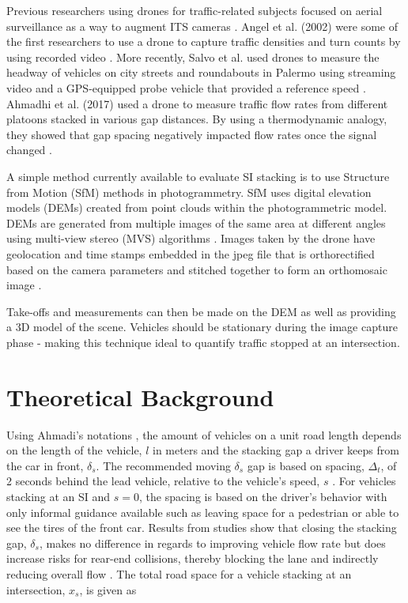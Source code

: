 \documentclass[preprint,12pt,a4paper]{elsarticle}
\begin{document}
\begin{linenumbers}
Previous researchers using drones for traffic-related subjects focused on aerial surveillance as a way to augment ITS cameras \citep{Liu2013, Barmpounakis2016}. Angel et al. (2002) were some of the first researchers to use a drone to capture traffic densities and turn counts by using recorded video \citep{Angel2002}. More recently, Salvo et al. used drones to measure the headway of vehicles on city streets and roundabouts in Palermo using streaming video and a GPS-equipped probe vehicle that provided a reference speed \citep{Salvo2014, Salvo2017}. Ahmadhi et al. (2017) used a drone to measure traffic flow rates from different platoons stacked in various gap distances. By using a thermodynamic analogy, they showed that gap spacing negatively impacted flow rates once the signal changed \citep{Ahmadi2017}.

A simple method currently available to evaluate SI stacking is to use Structure from Motion (SfM) methods in photogrammetry. SfM uses digital elevation models (DEMs) created from point clouds within the photogrammetric model. DEMs are generated from multiple images of the same area at different angles using multi-view stereo (MVS) algorithms \citep{James2017}. Images taken by the drone have geolocation and time stamps embedded in the jpeg file that is orthorectified based on the camera parameters and stitched together to form an orthomosaic image \citep{Westoby2012}.

Take-offs and measurements can then be made on the DEM as well as providing a 3D model of the scene. Vehicles should be stationary during the image capture phase - making this technique ideal to quantify traffic stopped at an intersection.

\section{Theoretical Background}

Using Ahmadi's notations \citep{Ahmadi2017}, the amount of vehicles on a unit road length depends on the length of the vehicle, $l$ in meters and the stacking gap a driver keeps from the car in front, $\delta_{s}$.  The recommended moving $\delta_{s}$ gap is based on spacing, $\Delta_{t}$, of 2 seconds behind the lead vehicle, relative to the vehicle's speed, $s$ \citep{NYDMV2015, ukdot2017}.  For vehicles stacking at an SI and $s=0$, the spacing is based on the driver's behavior with only informal guidance available such as leaving space for a pedestrian or able to see the tires of the front car. Results from studies show that closing the stacking gap, $\delta_{s}$, makes no difference in regards to improving vehicle flow rate but does increase risks for rear-end collisions, thereby blocking the lane and indirectly reducing overall flow \citep{Ahmadi2017}. The total road space for a vehicle stacking at an intersection, $x_{s}$, is given as


\end{linenumbers}
\end{document}
